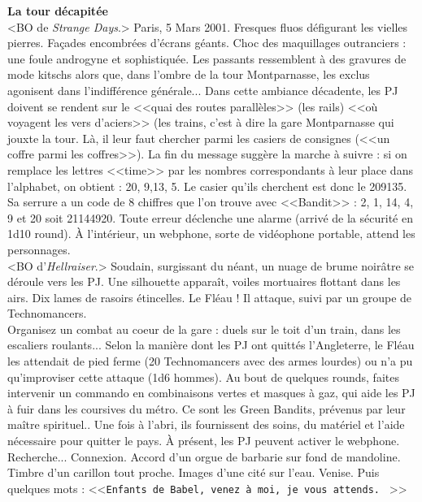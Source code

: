 \documentclass[11pt,twoside,a4paper]{book}
\begin{document}
\textbf{\large La tour d{\'e}capit{\'e}e}~\\

<BO de \emph{Strange Days}.> Paris, 5 Mars 2001. Fresques fluos d{\'e}figurant les vielles pierres. Fa\c{c}ades encombr{\'e}es d'{\'e}crans g{\'e}ants. Choc des maquillages outranciers : une foule androgyne et sophistiqu{\'e}e. Les passants ressemblent {\`a} des gravures de mode kitschs alors que, dans l'ombre de la tour Montparnasse, les exclus agonisent dans l'indiff{\'e}rence g{\'e}n{\'e}rale... Dans cette ambiance d{\'e}cadente, les PJ doivent se rendent sur le <<quai des routes parall{\`e}les>> (les rails) <<o{\`u} voyagent les vers d'aciers>> (les trains, c'est {\`a} dire la gare Montparnasse qui jouxte la tour. L{\`a}, il leur faut chercher parmi les casiers de consignes (<<un coffre parmi les coffres>>). La fin du message sugg{\`e}re la marche {\`a} suivre : si on remplace les lettres <<time>> par les nombres correspondants {\`a} leur place dans l'alphabet, on obtient : 20, 9,13, 5. Le casier qu'ils cherchent est donc le 209135. Sa serrure a un code de 8 chiffres que l'on trouve avec <<Bandit>> : 2, 1, 14, 4, 9 et 20 soit 21144920. Toute erreur d{\'e}clenche une alarme (arriv{\'e} de la s{\'e}curit{\'e} en 1d10 round). {\`A} l'int{\'e}rieur, un webphone, sorte de vid{\'e}ophone portable, attend les personnages.~\\

<BO d'\emph{Hellraiser}.> Soudain, surgissant du n{\'e}ant, un nuage de brume noir{\^a}tre se d{\'e}roule vers les PJ. Une silhouette appara{\^i}t, voiles mortuaires flottant dans les airs. Dix lames de rasoirs {\'e}tincelles. Le Fl{\'e}au ! Il attaque, suivi par un groupe de Technomancers.~\\

Organisez un combat au coeur de la gare : duels sur le toit d'un train, dans les escaliers roulants... Selon la mani{\`e}re dont les PJ ont quitt{\'e}s l'Angleterre, le Fl{\'e}au les attendait de pied ferme (20 Technomancers avec des armes lourdes) ou n'a pu qu'improviser cette attaque (1d6 hommes). Au bout de quelques rounds, faites intervenir un commando en combinaisons vertes et masques {\`a} gaz, qui aide les PJ {\`a} fuir dans les coursives du m{\'e}tro. Ce sont les Green Bandits, pr{\'e}venus par leur ma{\^i}tre spirituel.. Une fois {\`a} l'abri, ils fournissent des soins, du mat{\'e}riel et l'aide n{\'e}cessaire pour quitter le pays. {\`A} pr{\'e}sent, les PJ peuvent activer le webphone. Recherche... Connexion. Accord d'un orgue de barbarie sur fond de mandoline. Timbre d'un carillon tout proche. Images d'une cit{\'e} sur l'eau. Venise. Puis quelques mots : <<\texttt{Enfants de Babel, venez {\`a} moi, je vous attends. } >>~\\
\end{document}
